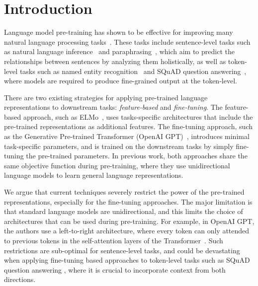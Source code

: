 \section{Introduction}

Language model pre-training has shown to be effective for improving many natural language processing tasks~\cite{dai-le:2015:_semi,peters-etal:2017:_semi, peters-etal:2018:_deep, radford-etal:2018, howard-ruder:2018}. These tasks include sentence-level tasks such as natural language inference~\cite{bowman-etal:2015, williams-nangia-bowman:2018} and paraphrasing~\cite{dolan-brockett:2005:_autom}, which aim to predict the relationships between sentences by analyzing them holistically, as well as token-level tasks such as named entity recognition~\cite{tjong-de:2003} and SQuAD question answering~\cite{rajpurkar-etal:2016:_squad}, where models are required to produce fine-grained output at the token-level.

There are two existing strategies for applying pre-trained language representations to downstream tasks: {\em feature-based} and {\em fine-tuning}. The feature-based approach, such as ELMo~\cite{peters-etal:2018:_deep}, uses tasks-specific architectures that include the pre-trained representations as additional features. The fine-tuning approach, such as the Generative Pre-trained Transformer (OpenAI GPT)~\cite{radford-etal:2018}, introduces minimal task-specific parameters, and is trained on the downstream tasks by simply fine-tuning the pre-trained parameters. In previous work, both approaches share the same objective function during pre-training, where they use unidirectional language models to learn general language representations.

We argue that current techniques severely restrict the power of the pre-trained representations, especially for the fine-tuning approaches. The major limitation is that standard language models are unidirectional, and this limits the choice of architectures that can be used during pre-training. For example, in OpenAI GPT, the authors use a left-to-right architecture, where every token can only attended to previous tokens in the self-attention layers of the Transformer~\cite{vaswani-etal:2017:_atten}. Such restrictions are sub-optimal for sentence-level tasks, and could be devastating when applying fine-tuning based approaches to token-level tasks such as SQuAD question answering \cite{rajpurkar-etal:2016:_squad}, where it is crucial to incorporate context from both directions.

